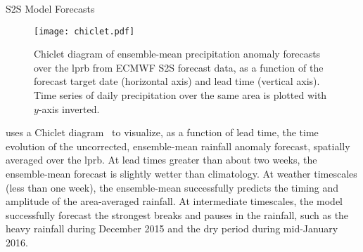 \begin{block}{S2S Model Forecasts}
    \begin{framed}
        \begin{figure}
            \centering
            \caption{
                Chiclet diagram of ensemble-mean precipitation anomaly forecasts over the \gls{lprb} from ECMWF S2S forecast data, as a function of the forecast target date (horizontal axis) and lead time (vertical axis).
                Time series of daily precipitation over the same area is plotted with $y$-axis inverted.
            }\label{fig:chiclet}
            \noindent\texttt{[image: chiclet.pdf]}
        \end{figure}
    \end{framed}
     uses a Chiclet diagram~\cite{Carbin:2016fx} to visualize, as a function of lead time, the time evolution of the uncorrected, ensemble-mean rainfall anomaly forecast, spatially averaged over the \gls{lprb}.
    At lead times greater than about two weeks, the ensemble-mean forecast is slightly wetter than climatology.
    At weather timescales (less than one week), the ensemble-mean successfully predicts the timing and amplitude of the area-averaged rainfall.
    At intermediate timescales, the model successfully forecast the strongest breaks and pauses in the rainfall, such as the heavy rainfall during December 2015 and the dry period during mid-January 2016.
\end{block}
